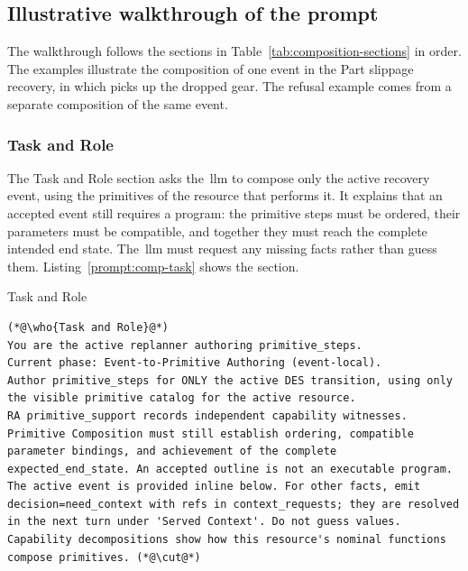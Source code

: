 
\FloatBarrier
\subsection{Illustrative walkthrough of the prompt}\label{sec:composition-walkthrough}

The walkthrough follows the sections in Table~\ref{tab:composition-sections} in order. The examples
illustrate the composition of one event in the Part slippage recovery, in which 
picks up the dropped gear. The refusal example comes from a separate composition of the same event.

\subsubsection{Task and Role}\label{sec:comp-task}

The Task and Role section asks the~\gls{llm} to compose only the active recovery event, using the
primitives of the resource that performs it. It explains that an accepted event still requires
a program: the primitive steps must be ordered, their parameters must be compatible, and together
they must reach the complete intended end state. The~\gls{llm} must request any missing facts rather
than guess them.
Listing~\ref{prompt:comp-task} shows the section.

\begin{recbox}{Task and Role}
\begin{lstlisting}
(*@\who{Task and Role}@*)
You are the active replanner authoring primitive_steps.
Current phase: Event-to-Primitive Authoring (event-local).
Author primitive_steps for ONLY the active DES transition, using only the visible primitive catalog for the active resource.
RA primitive_support records independent capability witnesses. Primitive Composition must still establish ordering, compatible parameter bindings, and achievement of the complete expected_end_state. An accepted outline is not an executable program.
The active event is provided inline below. For other facts, emit decision=need_context with refs in context_requests; they are resolved in the next turn under 'Served Context'. Do not guess values. Capability decompositions show how this resource's nominal functions compose primitives. (*@\cut@*)
\end{lstlisting}
\end{recbox}

